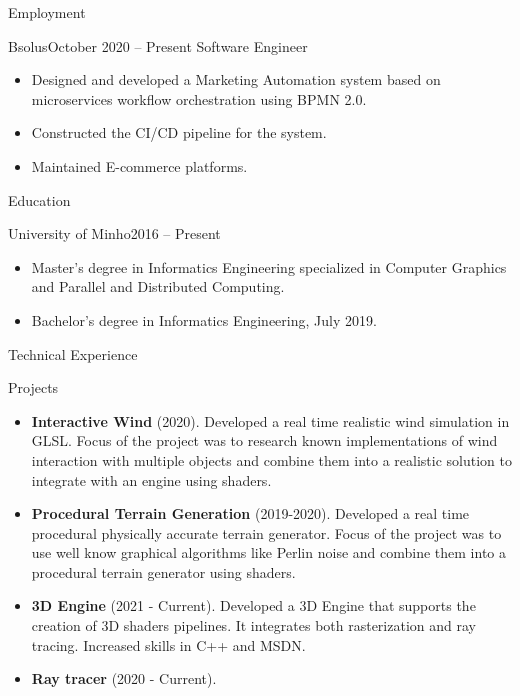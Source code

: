 \documentclass[]{mcdowellcv}
\begin{document}
	\makeheader

	\begin{cvsection}{Employment}
		\begin{cvsubsection}{Bsolus}{}{October 2020 -- Present}
			Software Engineer
			\begin{itemize}
                \item Designed and developed a Marketing Automation system based on microservices workflow orchestration using BPMN 2.0.
                \item Constructed the CI/CD pipeline for the system.
                \item Maintained E-commerce platforms.
			\end{itemize}
		\end{cvsubsection}
	\end{cvsection}

	\begin{cvsection}{Education}
		\begin{cvsubsection}{University of Minho}{}{2016 -- Present}
			\begin{itemize}
				\item Master’s degree in Informatics Engineering specialized in Computer Graphics and Parallel and Distributed Computing.
                \item Bachelor's degree in Informatics Engineering, July 2019.
			\end{itemize}
		\end{cvsubsection}
	\end{cvsection}

	\begin{cvsection}{Technical Experience}
		\begin{cvsubsection}{Projects}{}{}
			\begin{itemize}
				\item \textbf{Interactive Wind} (2020). Developed a real time realistic wind simulation in GLSL. Focus of the project was to research known implementations of wind interaction with multiple objects and combine them into a realistic solution to integrate with an engine using shaders.
				\item \textbf{Procedural Terrain Generation} (2019-2020). Developed a real time procedural physically accurate terrain generator. Focus of the project was to use well know graphical algorithms like Perlin noise and combine them into a procedural terrain generator using shaders.
				\item \textbf{3D Engine} (2021 - Current).  Developed a 3D Engine that supports the creation of 3D shaders pipelines. It integrates both rasterization and ray tracing. Increased skills in C++ and MSDN.
				\item \textbf{Ray tracer} (2020 - Current).


			\end{itemize}
		\end{cvsubsection}
	\end{cvsection}
\end{document}
